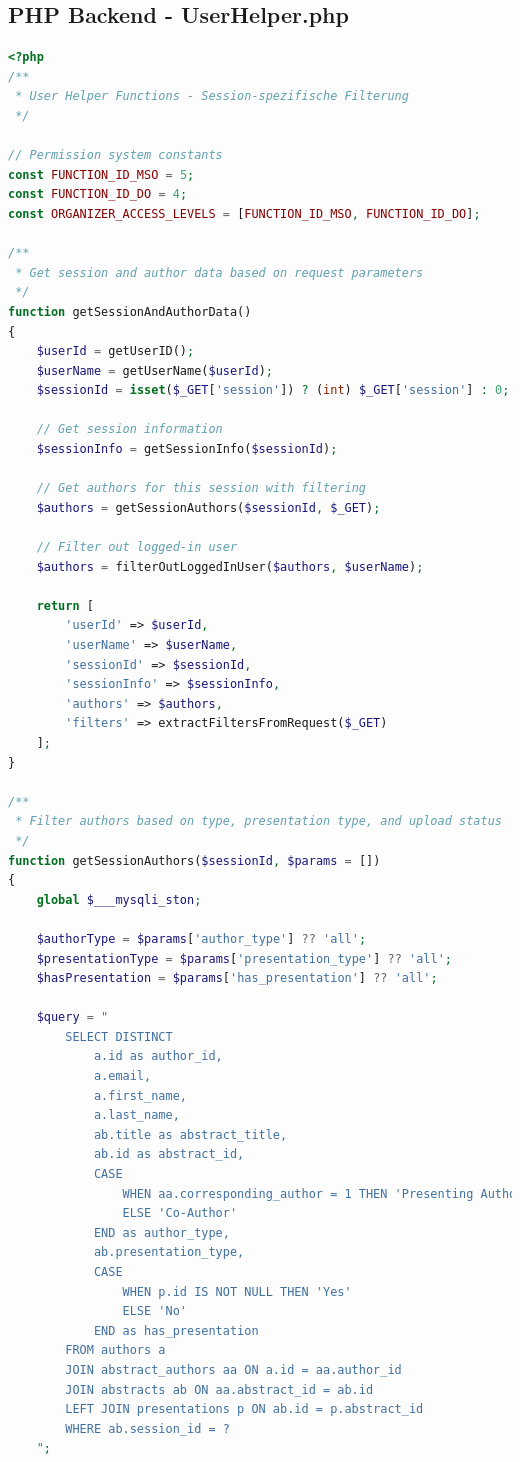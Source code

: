 \documentclass[11pt,a4paper]{article}
\begin{document}
\subsection{PHP Backend - UserHelper.php}
\begin{lstlisting}[language=PHP, caption=Autorenfilterung und Session-Management]
<?php
/**
 * User Helper Functions - Session-spezifische Filterung
 */

// Permission system constants
const FUNCTION_ID_MSO = 5;
const FUNCTION_ID_DO = 4;
const ORGANIZER_ACCESS_LEVELS = [FUNCTION_ID_MSO, FUNCTION_ID_DO];

/**
 * Get session and author data based on request parameters
 */
function getSessionAndAuthorData()
{
    $userId = getUserID();
    $userName = getUserName($userId);
    $sessionId = isset($_GET['session']) ? (int) $_GET['session'] : 0;
    
    // Get session information
    $sessionInfo = getSessionInfo($sessionId);
    
    // Get authors for this session with filtering
    $authors = getSessionAuthors($sessionId, $_GET);
    
    // Filter out logged-in user
    $authors = filterOutLoggedInUser($authors, $userName);
    
    return [
        'userId' => $userId,
        'userName' => $userName,
        'sessionId' => $sessionId,
        'sessionInfo' => $sessionInfo,
        'authors' => $authors,
        'filters' => extractFiltersFromRequest($_GET)
    ];
}

/**
 * Filter authors based on type, presentation type, and upload status
 */
function getSessionAuthors($sessionId, $params = [])
{
    global $___mysqli_ston;
    
    $authorType = $params['author_type'] ?? 'all';
    $presentationType = $params['presentation_type'] ?? 'all';
    $hasPresentation = $params['has_presentation'] ?? 'all';
    
    $query = "
        SELECT DISTINCT 
            a.id as author_id,
            a.email,
            a.first_name,
            a.last_name,
            ab.title as abstract_title,
            ab.id as abstract_id,
            CASE 
                WHEN aa.corresponding_author = 1 THEN 'Presenting Author'
                ELSE 'Co-Author'
            END as author_type,
            ab.presentation_type,
            CASE 
                WHEN p.id IS NOT NULL THEN 'Yes'
                ELSE 'No'
            END as has_presentation
        FROM authors a
        JOIN abstract_authors aa ON a.id = aa.author_id
        JOIN abstracts ab ON aa.abstract_id = ab.id
        LEFT JOIN presentations p ON ab.id = p.abstract_id
        WHERE ab.session_id = ?
    ";
    

\end{lstlisting}
\end{document}
